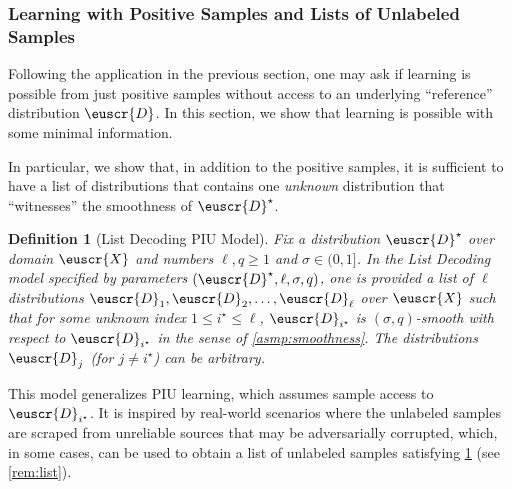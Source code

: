 \documentclass[11pt]{article}
\theoremstyle{plain}
\newtheorem{definition}{Definition}
\theoremstyle{definition}
\theoremstyle{remark}
\newcommand{\customcal}[1]{\euscr{#1}}
\newcommand{\cD}{\customcal{D}}
\newcommand{\cX}{\customcal{X}}
\newcommand{\cDtrue}{\cD^\star}
\newcommand{\cDgiven}{\cD}
\newcommand{\unlabeled}{{{\cDgiven}}}
\begin{document}
\subsubsection{Learning with Positive Samples and Lists of Unlabeled Samples}\label{sec:intro:application:listDecoding}

Following the application in the previous section, one may ask if learning is possible from just positive samples without access to an underlying ``reference'' distribution $\cD$. In this section, we show that learning is possible with some minimal information. 
    
In particular, we show that, in addition to the positive samples, it is sufficient to have a list of distributions that contains one \textit{unknown} distribution that ``witnesses'' the smoothness of $\cDtrue$.
\begin{definition}[List Decoding PIU Model]
    \label{def:list}
    Fix a distribution $\cDtrue$ over domain $\cX$ and numbers $\ell,q\geq 1$ and $\sigma\in (0,1]$.
    In the List Decoding model specified by parameters $(\cDtrue,\ell,\sigma,q)$, one is provided a list of $\ell$ distributions $\cDgiven_1, \cDgiven_2, \dots, \cDgiven_\ell$ over $\cX$ such that for some \textit{unknown} index $1\leq i^\star\leq \ell$,
    $\cD_{i^\star}$ is $(\sigma,q)$-smooth with respect to $\cD_{i^\star}$ in the sense of \cref{asmp:smoothness}. 
    The distributions $\unlabeled_j$ (for $j\neq i^\star$) can be arbitrary.
\end{definition}
This model generalizes PIU learning, which assumes sample access to $\cD_{i^\star}$. It is inspired by real-world scenarios where the unlabeled samples are scraped from unreliable sources that may be adversarially corrupted, which, in some cases, can be used to obtain a list of unlabeled samples satisfying \cref{def:list} (see \cref{rem:list}).
\end{document}
